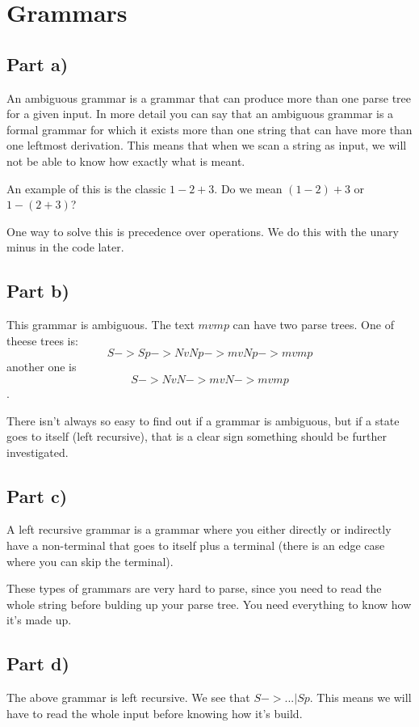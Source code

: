 \documentclass[paper=a4, fontsize=11pt]{scrartcl} %
\numberwithin{equation}{section} %
\numberwithin{figure}{section} %
\numberwithin{table}{section} %
\begin{document}
\section{Grammars}

\subsection{Part a)}
An ambiguous grammar is a grammar that can produce more than one parse tree for a given input. In more detail you can say that an ambiguous grammar is a formal grammar for which it exists more than one string that can have more than one leftmost derivation. This means that when we scan a string as input, we will not be able to know how exactly what is meant.

An example of this is the classic $1-2+3$. Do we mean $(1-2)+3$ or $1-(2+3)$?

One way to solve this is precedence over operations. We do this with the unary minus in the code later.

\subsection{Part b)}
This grammar is ambiguous. The text $mvmp$ can have two parse trees. One of theese trees is: $$S -> Sp -> NvNp -> mvNp -> mvmp$$ another one is $$S -> NvN -> mvN -> mvmp$$ .

There isn't always so easy to find out if a grammar is ambiguous, but if a state goes to itself (left recursive), that is a clear sign something should be further investigated.

\subsection{Part c)}
A left recursive grammar is a grammar where you either directly or indirectly have a non-terminal that goes to itself plus a terminal (there is an edge case where you can skip the terminal).

These types of grammars are very hard to parse, since you need to read the whole string before bulding up your parse tree. You need everything to know how it's made up.

\subsection{Part d)}
The above grammar is left recursive. We see that $S -> ... | Sp$. This means we will have to read the whole input before knowing how it's build.

\end{document}
